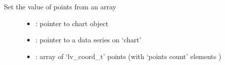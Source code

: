 \documentclass[letterpaper,10pt,english]{sphinxmanual}
\begin{document}
\begin{fulllineitems}
\label{\detokenize{object-types/chart:_CPPv419lv_chart_set_pointsP8lv_obj_tP17lv_chart_series_tA_10lv_coord_t}}%
\pysigstartmultiline
{}\label{\detokenize{object-types/chart:lv__chart_8h_1a613a2eb5ec662dbb0c14ebc46784827e}}%
\pysigstopmultiline
Set the value of points from an array \begin{description}
\item[{}] \leavevmode\begin{itemize}
\item {} 
: pointer to chart object 

\item {} 
: pointer to a data series on ‘chart’ 

\item {} 
: array of ‘lv\_coord\_t’ points (with ‘points count’ elements ) 

\end{itemize}

\end{description}


\end{fulllineitems}

\end{document}
